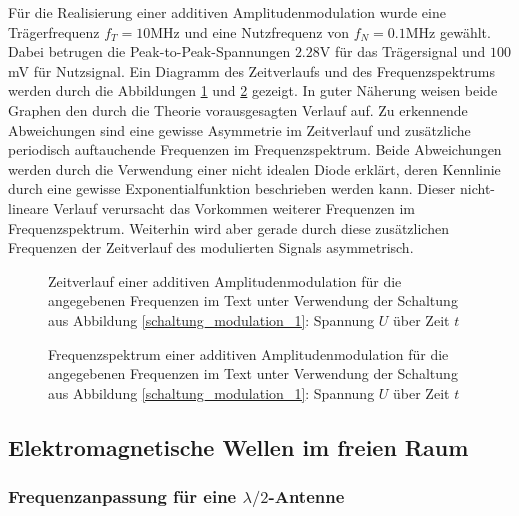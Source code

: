 	Für die Realisierung einer additiven Amplitudenmodulation wurde eine Trägerfrequenz $f_T = 10$MHz und eine Nutzfrequenz von $f_N = 0.1$MHz gewählt.
	Dabei betrugen die Peak-to-Peak-Spannungen $2.28$V für das Trägersignal und $100$mV für Nutzsignal.
	Ein Diagramm des Zeitverlaufs und des Frequenzspektrums werden durch die Abbildungen \ref{diagramm_modulation_amplitude} und \ref{diagramm_modulation_frequenz} gezeigt.
	In guter Näherung weisen beide Graphen den durch die Theorie vorausgesagten Verlauf auf.
	Zu erkennende Abweichungen sind eine gewisse Asymmetrie im Zeitverlauf und zusätzliche periodisch auftauchende Frequenzen im Frequenzspektrum.
	Beide Abweichungen werden durch die Verwendung einer nicht idealen Diode erklärt, deren Kennlinie durch eine gewisse Exponentialfunktion beschrieben werden kann.
	Dieser nicht-lineare Verlauf verursacht das Vorkommen weiterer Frequenzen im Frequenzspektrum.
	Weiterhin wird aber gerade durch diese zusätzlichen Frequenzen der Zeitverlauf des modulierten Signals asymmetrisch.	

	\begin{figure}[H]
		\center
		
		\caption{\centering Zeitverlauf einer additiven Amplitudenmodulation für die angegebenen Frequenzen im Text unter Verwendung der Schaltung aus Abbildung \ref{schaltung_modulation_1}: Spannung $U$ über Zeit $t$}
		\label{diagramm_modulation_amplitude}
	\end{figure}

	\begin{figure}[H]
		\center
		
		\caption{\centering Frequenzspektrum einer additiven Amplitudenmodulation für die angegebenen Frequenzen im Text unter Verwendung der Schaltung aus Abbildung \ref{schaltung_modulation_1}: Spannung $U$ über Zeit $t$}
		\label{diagramm_modulation_frequenz}
	\end{figure}


\subsection{Elektromagnetische Wellen im freien Raum} %
\label{sub:elektromagnetische_wellen_im_freien_raum}

	\subsubsection{Frequenzanpassung für eine $\lambda/2$-Antenne} %
	\label{ssub:frequenzanpassung_f_r_eine_}
	
